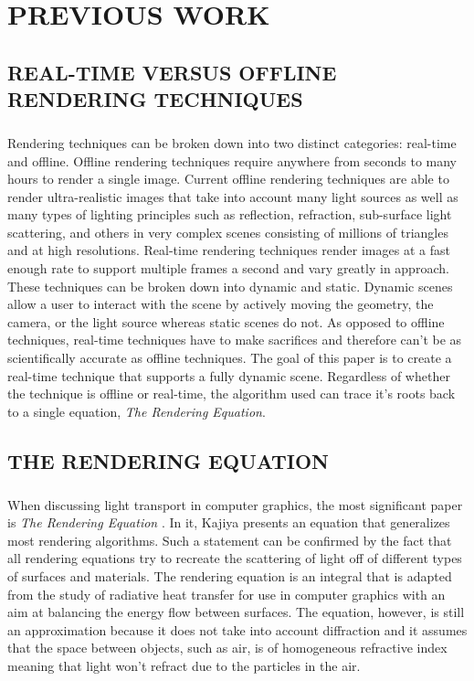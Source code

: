 \chapter{PREVIOUS WORK} \label{sec:prevwork}

\section{REAL-TIME VERSUS OFFLINE RENDERING TECHNIQUES}
\paragraph{}
Rendering techniques can be broken down into two distinct categories: real-time and offline.  Offline rendering techniques require anywhere from seconds to many hours to render a single image.  Current offline rendering techniques are able to render ultra-realistic images that take into account many light sources as well as many types of lighting principles such as reflection, refraction, sub-surface light scattering, and others in very complex scenes consisting of millions of triangles and at high resolutions.  Real-time rendering techniques render images at a fast enough rate to support multiple frames a second and vary greatly in approach.  These techniques can be broken down into dynamic and static.  Dynamic scenes allow a user to interact with the scene by actively moving the geometry, the camera, or the light source whereas static scenes do not.  As opposed to offline techniques, real-time techniques have to make sacrifices and therefore can't be as scientifically accurate as offline techniques.  The goal of this paper is to create a real-time technique that supports a fully dynamic scene.  Regardless of whether the technique is offline or real-time, the algorithm used can trace it's roots back to a single equation, \textit{The Rendering Equation}.

\section{THE RENDERING EQUATION} \label{sec:render}
\paragraph{}
When discussing light transport in computer graphics, the most significant paper is \textit{The Rendering Equation} \cite{Kajiya1986}.  In it, Kajiya presents an equation that generalizes most rendering algorithms.  Such a statement can be confirmed by the fact that all rendering equations try to recreate the scattering of light off of different types of surfaces and materials.  The rendering equation is an integral that is adapted from the study of radiative heat transfer for use in computer graphics with an aim at balancing the energy flow between surfaces.  The equation, however, is still an approximation because it does not take into account diffraction and it assumes that the space between objects, such as air, is of homogeneous refractive index meaning that light won't refract due to the particles in the air.

